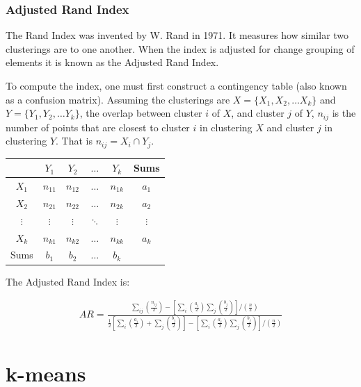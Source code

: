 \documentclass{article}
\begin{document}
\subsubsection{Adjusted Rand Index}
The Rand Index was invented by W. Rand in 1971. It measures how similar two
clusterings are to one another. When the index is adjusted for change grouping
of elements it is known as the Adjusted Rand Index.

To compute the index, one must first construct a contingency table (also known
as a confusion matrix). Assuming the clusterings are $X = \{X_1, X_2, \ldots
X_k\}$ and $Y = \{Y_1, Y_2, \ldots Y_k\}$, the overlap between cluster $i$ of
$X$, and cluster $j$ of $Y$, $n_{ij}$ is the number of points that are closest
to cluster $i$ in clustering $X$ and cluster $j$ in clustering $Y$. That is
$n_{ij} = X_i \cap Y_j$.

\begin{center}
    \begin{tabular}{c | c  c  c  c | c}
        & $Y_1$ & $Y_2$ & $\ldots$ & $Y_k$ & Sums \\
        \hline
        $X_1$ & $n_{11}$ & $n_{12}$ & $\ldots$ & $n_{1k}$ & $a_1$ \\
        $X_2$ & $n_{21}$ & $n_{22}$ & $\ldots$ & $n_{2k}$ & $a_2$ \\
        $\vdots$ & $\vdots$ & $\vdots$ & $\ddots$ & $\vdots$ & $\vdots$ \\
        $X_k$ & $n_{k1}$ & $n_{k2}$ & $\ldots$ & $n_{kk}$ & $a_k$ \\
        \hline
        Sums & $b_1$ & $b_2$ & $\ldots$ & $b_k$ & \\
    \end{tabular}
\end{center}

The Adjusted Rand Index is:

\begin{eqnarray}
    AR = \frac{\sum_{ij} \left( \frac{n_{ij}}{2} \right) - \left[\sum_i
        \left( \frac{a_i}{2} \right) \sum_j \left( \frac{b_j}{2} \right)
        \right]/\left( \frac{n}{2} \right)}{\frac{1}{2} \left[ \sum_i \left(
            \frac{a_i}{2} \right) + \sum_j \left( \frac{b_j}{2} \right) \right] - \left[\sum_i
        \left( \frac{a_i}{2} \right) \sum_j \left( \frac{b_j}{2} \right)
        \right]/\left( \frac{n}{2} \right)}
\end{eqnarray}

\section{k-means}
\end{document}
